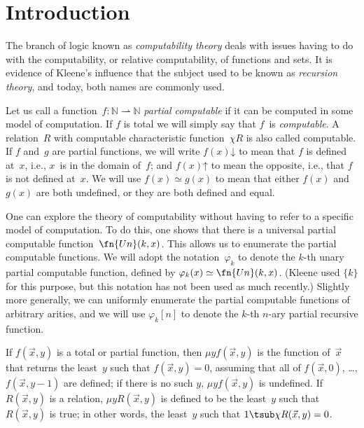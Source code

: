\documentclass[10pt,a4paper]{article}
\theoremstyle{plain}
\theoremstyle{definition}
\theoremstyle{remark}
\newcommand*{\olfileid}[3]{}
\newcommand*{\olsection}[1]{\section*{#1}}
\providecommand{\cfind}[1]{\varphi_{#1}}
\providecommand{\Nat}{\ensuremath{\mathbb{N}}}
\providecommand{\fdefined}{\mathord{\downarrow}}
\providecommand{\pto}{\rightharpoonup}
\providecommand{\Char}{\chi}
\providecommand{\umin}{\mu}
\providecommand{\fundefined}{\mathord{\uparrow}}
\begin{document}



\olfileid{cmp}{thy}{int}
\olsection{Introduction}

The branch of logic known as \emph{computability theory} deals with
issues having to do with the computability, or relative computability,
of functions and sets. It is evidence of Kleene's influence
that the subject used to be known as \emph{recursion theory}, and
today, both names are commonly used.

Let us call a function~$f\colon \Nat \pto \Nat$ \emph{partial
  computable} if it can be computed in some model of computation. If
$f$ is total we will simply say that $f$~is \emph{computable}. A
relation~$R$ with computable characteristic function~$\Char{R}$ is
also called computable. If $f$ and~$g$ are partial functions, we will
write $f(x) \fdefined$ to mean that $f$ is defined at~$x$, i.e., $x$~is
in the domain of~$f$; and $f(x) \fundefined$ to mean the opposite,
i.e., that $f$ is not defined at~$x$. We will use $f(x) \simeq g(x)$
to mean that either $f(x)$ and $g(x)$ are both undefined, or they are
both defined and equal.

One can explore the theory of computability without having to refer to
a specific model of computation. To do this, one shows that there is a
universal partial computable function~$\fn{Un}(k, x)$. This allows us
to enumerate the partial computable functions. We will adopt the
notation~$\cfind{k}$ to denote the $k$-th unary partial computable
function, defined by $\cfind{k}(x) \simeq \fn{Un}(k, x)$. (Kleene used
$\{ k \}$ for this purpose, but this notation has not been used as
much recently.)  Slightly more generally, we can uniformly enumerate
the partial computable functions of arbitrary arities, and we will use
$\cfind{k}[n]$ to denote the $k$-th $n$-ary partial recursive
function.

If $f(\vec x, y)$ is a total or partial function, then $\umin{y}{f
(\vec x, y)}$ is the function of~$\vec x$ that returns the least~$y$
such that $f(\vec x, y) = 0$, assuming that all of $f(\vec x, 0)$,
\dots, $f(\vec x, y-1)$ are defined; if there is no such $y$,
$\umin{y}{f (\vec x, y)}$ is undefined. If $R(\vec x, y)$ is a
relation, $\umin{y}{R(\vec x, y)}$ is defined to be the least~$y$ such
that $R(\vec x, y)$ is true; in other words, the least~$y$ such that
$1 \tsub \Char{R}(\vec x, y) = 0$.
\end{document}
